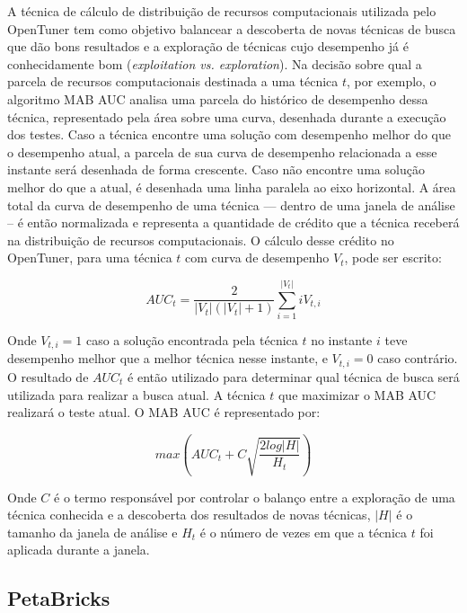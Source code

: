 \documentclass[a4paper, 11pt]{article}
\begin{document}
A técnica de cálculo de distribuição de recursos computacionais utilizada
pelo OpenTuner tem como objetivo balancear a descoberta de novas técnicas
de busca que dão bons resultados e a exploração de técnicas cujo desempenho
já é conhecidamente bom (\emph{exploitation vs. exploration}). Na decisão sobre
qual a parcela de recursos computacionais destinada a uma técnica $t$, por
exemplo, o algoritmo MAB AUC analisa uma parcela do histórico de desempenho 
dessa técnica, representado pela área sobre uma curva, desenhada durante a
execução dos testes. Caso a técnica encontre uma solução com desempenho melhor
do que o desempenho atual, a parcela de sua curva de desempenho relacionada a
esse instante será desenhada de forma crescente. Caso não encontre uma solução
melhor do que a atual, é desenhada uma linha paralela ao eixo horizontal. A
área total da curva de desempenho de uma técnica --- dentro de uma janela de
análise -- é então normalizada e representa a quantidade de crédito que a 
técnica receberá na distribuição de recursos computacionais. O cálculo desse 
crédito no OpenTuner, para uma técnica $t$ com curva de desempenho $V_t$, pode
ser escrito:

\begin{equation*}
    AUC_t = \frac{2} {|V_t|(|V_t|+1)} \sum_{i=1}^{|V_t|} iV_{t,i}
\end{equation*}

Onde $V_{t,i} = 1$ caso a solução encontrada pela técnica $t$ no instante
$i$ teve desempenho melhor que a melhor técnica nesse instante, e 
$V_{t,i} = 0$ caso contrário. O resultado de $AUC_t$ é então utilizado para
determinar qual técnica de busca será utilizada para realizar a busca atual.
A técnica $t$ que maximizar o MAB AUC realizará o teste atual. O MAB AUC é
representado por:

\begin{equation*}
    max \left( AUC_t + C\sqrt{\frac{2log|H|}{H_t}} \right)
\end{equation*}

Onde $C$ é o termo responsável por controlar o balanço entre a exploração de 
uma técnica conhecida e a descoberta dos resultados de novas técnicas, $|H|$ é
o tamanho da janela de análise e $H_t$ é o número de vezes em que a técnica $t$
foi aplicada durante a janela.

\subsection{PetaBricks} \label{sec:peta}
\end{document}
